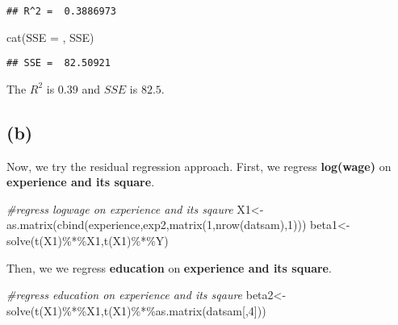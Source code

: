 \documentclass[
]{article}
\newenvironment{Shaded}{\begin{snugshade}}{\end{snugshade}}
\newcommand{\CommentTok}[1]{\textcolor[rgb]{0.56,0.35,0.01}{\textit{#1}}}
\newcommand{\DecValTok}[1]{\textcolor[rgb]{0.00,0.00,0.81}{#1}}
\newcommand{\FunctionTok}[1]{\textcolor[rgb]{0.00,0.00,0.00}{#1}}
\newcommand{\NormalTok}[1]{#1}
\newcommand{\OtherTok}[1]{\textcolor[rgb]{0.56,0.35,0.01}{#1}}
\newcommand{\SpecialCharTok}[1]{\textcolor[rgb]{0.00,0.00,0.00}{#1}}
\newcommand{\StringTok}[1]{\textcolor[rgb]{0.31,0.60,0.02}{#1}}
\begin{document}
\begin{verbatim}
## R^2 =  0.3886973
\end{verbatim}

\begin{Shaded}
\begin{Highlighting}[]
\FunctionTok{cat}\NormalTok{(}\StringTok{\textquotesingle{}SSE = \textquotesingle{}}\NormalTok{, SSE)}
\end{Highlighting}
\end{Shaded}

\begin{verbatim}
## SSE =  82.50921
\end{verbatim}

The \(R^2\) is \(0.39\) and \(SSE\) is \(82.5\).

\hypertarget{b}{%
\subsection{(b)}\label{b}}

Now, we try the residual regression approach. First, we regress
\textbf{log(wage)} on \textbf{experience and its square}.

\begin{Shaded}
\begin{Highlighting}[]
\CommentTok{\#regress logwage on experience and its sqaure}
\NormalTok{X1}\OtherTok{\textless{}{-}}\FunctionTok{as.matrix}\NormalTok{(}\FunctionTok{cbind}\NormalTok{(experience,exp2,}\FunctionTok{matrix}\NormalTok{(}\DecValTok{1}\NormalTok{,}\FunctionTok{nrow}\NormalTok{(datsam),}\DecValTok{1}\NormalTok{)))}
\NormalTok{beta1}\OtherTok{\textless{}{-}}\FunctionTok{solve}\NormalTok{(}\FunctionTok{t}\NormalTok{(X1)}\SpecialCharTok{\%*\%}\NormalTok{X1,}\FunctionTok{t}\NormalTok{(X1)}\SpecialCharTok{\%*\%}\NormalTok{Y)}
\end{Highlighting}
\end{Shaded}

Then, we we regress \textbf{education} on \textbf{experience and its
square}.

\begin{Shaded}
\begin{Highlighting}[]
\CommentTok{\#regress education on experience and its sqaure}
\NormalTok{beta2}\OtherTok{\textless{}{-}}\FunctionTok{solve}\NormalTok{(}\FunctionTok{t}\NormalTok{(X1)}\SpecialCharTok{\%*\%}\NormalTok{X1,}\FunctionTok{t}\NormalTok{(X1)}\SpecialCharTok{\%*\%}\FunctionTok{as.matrix}\NormalTok{(datsam[,}\DecValTok{4}\NormalTok{]))}
\end{Highlighting}
\end{Shaded}
\end{document}
